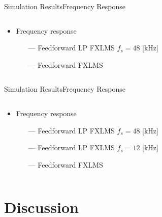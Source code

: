 \begin{frame}{Simulation Results}{Frequency Response}		
\begin{columns}
	\begin{column}{0.4\textwidth}
		\begin{itemize}
			\item Frequency response
			\begin{itemize}
				\item[\textcolor{MATLABorange}{---}] Feedforward LP FXLMS $f_s= 48$ [kHz]  
				\item[\textcolor{MATLABblue}{---}] Feedforward FXLMS 
			\end{itemize}
		\end{itemize}
	\end{column}
	\begin{column}{0.6\textwidth} 
		\resizebox{0.9\columnwidth}{!}{		
			}
	\end{column}
\end{columns}
\end{frame}


\begin{frame}{Simulation Results}{Frequency Response}		
\begin{columns}
	\begin{column}{0.4\textwidth}
		\begin{itemize}
			\item Frequency response
			\begin{itemize}
				\item[\textcolor{MATLABorange}{---}] Feedforward LP FXLMS $f_s= 48$ [kHz]
				\item[\textcolor{MATLABpurple}{---}] Feedforward LP FXLMS $f_s= 12$ [kHz]  
				\item[\textcolor{MATLABblue}{---}] Feedforward FXLMS  
			\end{itemize}
		\end{itemize}
	\end{column}
	\begin{column}{0.6\textwidth} 
		\resizebox{0.9\columnwidth}{!}{		
			}
	\end{column}
\end{columns}
\end{frame}




\section{Discussion}

